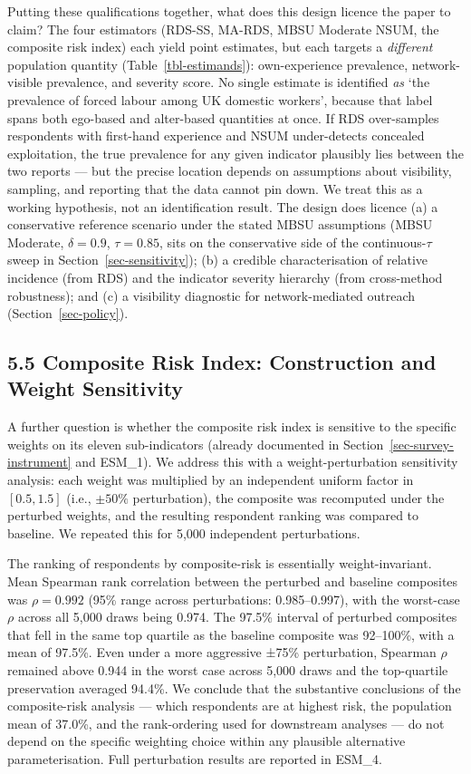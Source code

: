 \documentclass[
  12pt,
  letterpaper,
  DIV=11,
  numbers=noendperiod]{scrartcl}
\begin{document}
Putting these qualifications together, what does this design licence the
paper to claim? The four estimators (RDS-SS, MA-RDS, MBSU Moderate NSUM,
the composite risk index) each yield point estimates, but each targets a
\emph{different} population quantity (Table~\ref{tbl-estimands}):
own-experience prevalence, network-visible prevalence, and severity
score. No single estimate is identified \emph{as} `the prevalence of
forced labour among UK domestic workers', because that label spans both
ego-based and alter-based quantities at once. If RDS over-samples
respondents with first-hand experience and NSUM under-detects concealed
exploitation, the true prevalence for any given indicator plausibly lies
between the two reports --- but the precise location depends on
assumptions about visibility, sampling, and reporting that the data
cannot pin down. We treat this as a working hypothesis, not an
identification result. The design does licence (a) a conservative
reference scenario under the stated MBSU assumptions (MBSU Moderate,
\(\delta = 0.9\), \(\tau = 0.85\), sits on the conservative side of the
continuous-\(\tau\) sweep in Section~\ref{sec-sensitivity}); (b) a
credible characterisation of relative incidence (from RDS) and the
indicator severity hierarchy (from cross-method robustness); and (c) a
visibility diagnostic for network-mediated outreach
(Section~\ref{sec-policy}).

\subsection{5.5 Composite Risk Index: Construction and Weight
Sensitivity}\label{sec-weights-sensitivity}

A further question is whether the composite risk index is sensitive to
the specific weights on its eleven sub-indicators (already documented in
Section~\ref{sec-survey-instrument} and ESM\_1). We address this with a
weight-perturbation sensitivity analysis: each weight was multiplied by
an independent uniform factor in \([0.5, 1.5]\) (i.e., \(\pm 50\%\)
perturbation), the composite was recomputed under the perturbed weights,
and the resulting respondent ranking was compared to baseline. We
repeated this for 5,000 independent perturbations.

The ranking of respondents by composite-risk is essentially
weight-invariant. Mean Spearman rank correlation between the perturbed
and baseline composites was \(\rho = 0.992\) (95\% range across
perturbations: 0.985--0.997), with the worst-case \(\rho\) across all
5,000 draws being 0.974. The 97.5\% interval of perturbed composites
that fell in the same top quartile as the baseline composite was
92--100\%, with a mean of 97.5\%. Even under a more aggressive ±75\%
perturbation, Spearman \(\rho\) remained above 0.944 in the worst case
across 5,000 draws and the top-quartile preservation averaged 94.4\%. We
conclude that the substantive conclusions of the composite-risk analysis
--- which respondents are at highest risk, the population mean of
37.0\%, and the rank-ordering used for downstream analyses --- do not
depend on the specific weighting choice within any plausible alternative
parameterisation. Full perturbation results are reported in ESM\_4.
\end{document}
